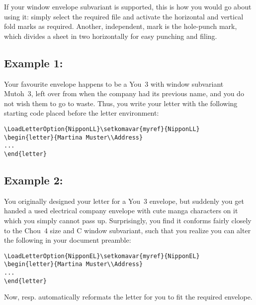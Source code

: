 If your window envelope subvariant is supported, this is how you would
go about using it: simply select the required  file and
activate the horizontal and vertical fold marks as required. Another,
independent, mark is the hole-punch mark, which divides a sheet in two
horizontally for easy punching and filing.

\subsection{Example 1:}
Your favourite envelope happens to be a You~3 with window subvariant
Mutoh~3, left over from when the company had its previous name, and
you do not wish them to go to waste. Thus, you write your letter with
the following starting code placed before the letter environment:

\begin{lstlisting}
\LoadLetterOption{NipponLL}\setkomavar{myref}{NipponLL}
\begin{letter}{Martina Muster\\Address}
...
\end{letter}
\end{lstlisting}

\subsection{Example 2:}
You originally designed your letter for a You~3 envelope, but suddenly
you get handed a used electrical company envelope with cute manga
characters on it which you simply cannot pass up. Surprisingly, you
find it conforms fairly closely to the Chou~4 size and C window
subvariant, such that you realize you can alter the following in your
document preamble:

\begin{lstlisting}
\LoadLetterOption{NipponEL}\setkomavar{myref}{NipponEL}
\begin{letter}{Martina Muster\\Address}
...
\end{letter}
\end{lstlisting}

Now,  resp.  automatically reformats the
letter for you to fit the required envelope.


